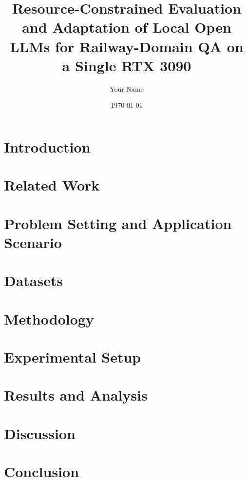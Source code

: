 \documentclass[11pt]{article}
\title{Resource-Constrained Evaluation and Adaptation of Local Open LLMs for Railway-Domain QA on a Single RTX 3090}
\author{Your Name}
\date{\today}
\begin{document}
\maketitle

\begin{abstract}

\end{abstract}

\section{Introduction}


\section{Related Work}


\section{Problem Setting and Application Scenario}


\section{Datasets}


\section{Methodology}


\section{Experimental Setup}


\section{Results and Analysis}


\section{Discussion}


\section{Conclusion}


\nocite{*}


\end{document}
